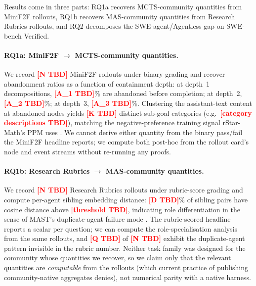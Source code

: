 \documentclass{article}
\newcommand{\expnum}[1]{\textcolor{red}{\textbf{[#1]}}}
\begin{document}
Results come in three parts: RQ1a recovers MCTS-community
quantities from MiniF2F rollouts, RQ1b recovers MAS-community
quantities from Research Rubrics rollouts, and RQ2 decomposes
the SWE-agent/Agentless gap on SWE-bench Verified.

\paragraph{RQ1a: MiniF2F $\to$ MCTS-community quantities.}
We record \expnum{N TBD} MiniF2F rollouts under binary grading
and recover abandonment ratios as a function of containment
depth: at depth~1 decompositions,
\expnum{A\_1 TBD}\% are abandoned before completion; at
depth~2, \expnum{A\_2 TBD}\%; at depth~3, \expnum{A\_3 TBD}\%.
Clustering the assistant-text content at abandoned
nodes yields \expnum{K TBD} distinct sub-goal categories
(e.g.\ \expnum{category descriptions TBD}), matching the
negative-preference training signal rStar-Math's PPM uses
\citep{rstarmath2025}. We cannot derive either quantity from
the binary pass/fail the MiniF2F headline reports; we compute
both post-hoc from the rollout card's node and event streams
without re-running any proofs.

\paragraph{RQ1b: Research Rubrics $\to$ MAS-community
quantities.} We record \expnum{N TBD} Research Rubrics
rollouts under rubric-score grading and compute per-agent
sibling embedding distance: \expnum{D TBD}\% of sibling pairs
have cosine distance above \expnum{threshold TBD}, indicating
role differentiation in the sense of MAST's duplicate-agent
failure mode \citep{cemri2025mast}. The rubric-scored headline
reports a scalar per question; we can compute the
role-specialisation analysis from the same rollouts, and
\expnum{Q TBD} of \expnum{N TBD} exhibit the duplicate-agent
pattern invisible in the rubric number. Neither
task family was designed for the community whose quantities
we recover, so we claim only that the relevant quantities are
\emph{computable} from the rollouts (which current practice
of publishing community-native aggregates denies), not
numerical parity with a native harness.
\end{document}
